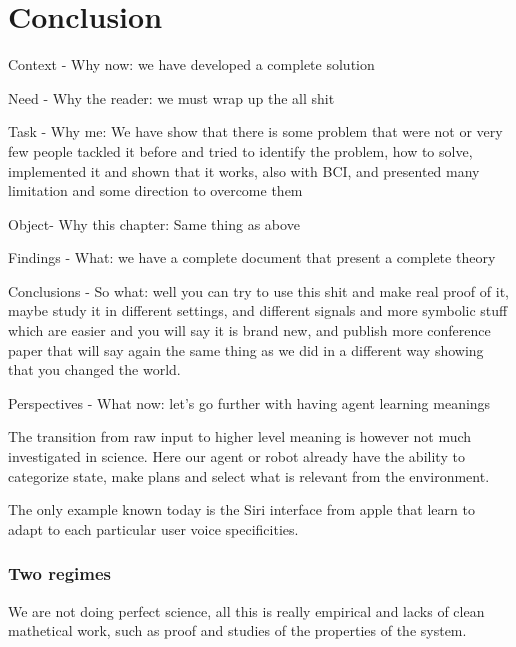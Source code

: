 
\chapter{Conclusion}
\label{chapter:conclusion}
\minitoc


Context - Why now: we have developed a complete solution

Need - Why the reader: we must wrap up the all shit 

Task - Why me: We have show that there is some problem that were not or very few people tackled it before and tried to identify the problem, how to solve, implemented it and shown that it works, also with BCI, and presented many limitation and some direction to overcome them

Object- Why this chapter: Same thing as above

Findings - What: we have a complete document that present a complete theory

Conclusions - So what: well you can try to use this shit and make real proof of it, maybe study it in different settings, and different signals and more symbolic stuff which are easier and you will say it is brand new, and publish more conference paper that will say again the same thing as we did in a different way showing that you changed the world.

Perspectives - What now: let's go further with having agent learning meanings

The transition from raw input to higher level meaning is however not much investigated in science. Here our agent or robot already have the ability to categorize state, make plans and select what is relevant from the environment.

The only example known today is the Siri interface from apple that learn to adapt to each particular user voice specificities.



\subsection{Two regimes}

We are not doing perfect science, all this is really empirical and lacks of clean mathetical work, such as proof and studies of the properties of the system. 

